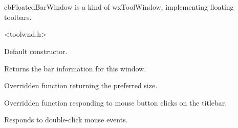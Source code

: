 %
%


\section{}\label{cbfloatedbarwindow}


cbFloatedBarWindow is a kind of wxToolWindow,
implementing floating toolbars.




<toolwnd.h>




\label{cbfloatedbarwindowcbfloatedbarwindow}


Default constructor.


\label{cbfloatedbarwindowgetbar}


Returns the bar information for this window.


\label{cbfloatedbarwindowgetpreferredsize}


Overridden function returning the preferred size.


\label{cbfloatedbarwindowhandletitleclick}


Overridden function responding to mouse button clicks on the titlebar.


\label{cbfloatedbarwindowondblclick}


Responds to double-click mouse events.


\label{cbfloatedbarwindowonminibuttonclicked}

